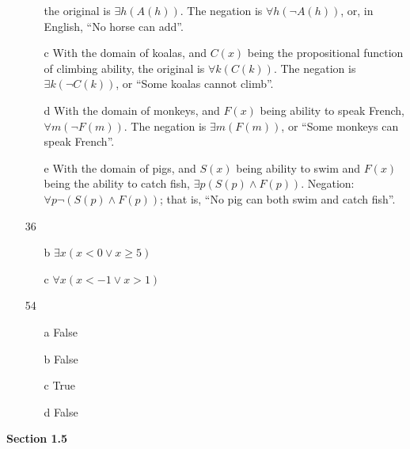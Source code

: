 \documentclass{article}
\begin{document}
\begin{itemize}
\begin{itemize}
        the original is $\exists h (A(h))$. The negation is $\forall h (\neg A(h))$,
        or, in English, ``No horse can add''.
      \item[c] With the domain of koalas, and $C(x)$ being the propositional
        function of climbing ability, the original is $\forall k (C(k))$. The
        negation is $\exists k (\neg C(k))$, or ``Some koalas cannot climb''.
      \item[d] With the domain of monkeys, and $F(x)$ being ability to speak
        French, $\forall m (\neg F(m))$. The negation is $\exists m (F(m))$, or
        ``Some monkeys can speak French''.
      \item[e] With the domain of pigs, and $S(x)$ being ability to swim and
        $F(x)$ being the ability to catch fish, $\exists p (S(p) \land F(p))$.
        Negation: $\forall p \neg(S(p) \land F(p))$; that is, ``No pig can both
        swim and catch fish''.
    \end{itemize}
  \item[36]
    \begin{itemize}
      \item[b] $\exists x (x < 0 \lor x \geq 5)$
      \item[c] $\forall x (x < -1 \lor x > 1)$
    \end{itemize}
  \item[54]
    \begin{itemize}
      \item[a] False
      \item[b] False
      \item[c] True
      \item[d] False
    \end{itemize}
\end{itemize}
\textbf{Section 1.5}
\end{document}
